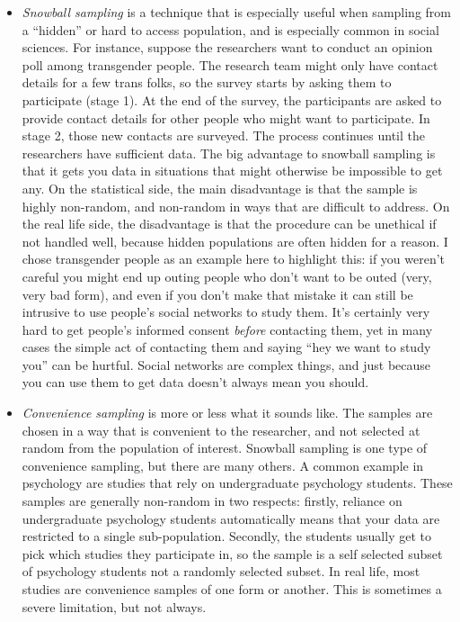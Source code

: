 \begin{itemize}
\item {\it Snowball sampling} is a technique that is especially useful when sampling from a ``hidden'' or hard to access population, and is especially common in social sciences. For instance, suppose the researchers want to conduct an opinion poll among transgender people. The research team might only have contact details for a few trans folks, so the survey starts by asking them to participate (stage 1). At the end of the survey, the participants are asked to provide contact details for other people who might want to participate. In stage 2, those new contacts are surveyed. The process continues until the researchers have sufficient data. The big advantage to snowball sampling is that it gets you data in situations that might otherwise be impossible to get any. On the statistical side, the main disadvantage is that the sample is highly non-random, and non-random in ways that are difficult to address. On the real life side, the disadvantage is that the procedure can be unethical if not handled well, because hidden populations are often hidden for a reason. I chose transgender people as an example here to highlight this: if you weren't careful you might end up outing people who don't want to be outed (very, very bad form), and even if you don't make that mistake it can still be intrusive to use people's social networks to study them. It's certainly very hard to get people's informed consent {\it before} contacting them, yet in many cases the simple act of contacting them and saying ``hey we want to study you'' can be hurtful. Social networks are complex things, and just because you can use them to get data doesn't always mean you should.
\item {\it Convenience sampling} is more or less what it sounds like. The samples are chosen in a way that is convenient to the researcher, and not selected at random from the population of interest. Snowball sampling is one type of convenience sampling, but there are many others. A common example in psychology are studies that rely on undergraduate psychology students. These samples are generally non-random in two respects: firstly, reliance on undergraduate psychology students automatically means that your data are restricted to a single sub-population. Secondly, the students usually get to pick which studies they participate in, so the sample is a self selected subset of psychology students not a randomly selected subset. In real life, most studies are convenience samples of one form or another. This is sometimes a severe limitation, but not always.
\end{itemize}

